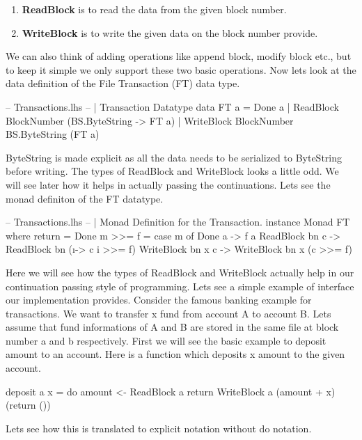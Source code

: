 \documentclass[11pt,a4paper]{article}
\begin{document}
\begin{enumerate}
\item \textbf{ReadBlock} is to read the data from the given block number.
\item \textbf{WriteBlock} is to write the given data on the block number provide.
\end{enumerate}

We can also think of adding operations like append block, modify block
etc., but to keep it simple we only support these two basic operations.
Now lets look at the data definition of the File Transaction (FT) data
type.

\begin{code}[name=Transactions]
-- Transactions.lhs
-- | Transaction Datatype
data FT a = 
    Done a | 
    ReadBlock BlockNumber (BS.ByteString -> FT a) | 
    WriteBlock BlockNumber BS.ByteString (FT a)
\end{code}

ByteString is made explicit as all the data needs to be serialized to ByteString before writing.
The types of ReadBlock and WriteBlock looks a little odd. We will see later how it helps in actually passing the continuations.
Lets see the monad definiton of the FT datatype.

\begin{code}[name=Transactions]
-- Transactions.lhs
-- | Monad Definition for the Transaction. 
instance Monad FT where 
    return = Done 
    m >>= f = case m of 
        Done a -> f a 
        ReadBlock bn c -> ReadBlock bn (\i -> c i  >>= f) 
        WriteBlock bn x c -> WriteBlock bn x (c >>= f)
\end{code}

Here we will see how the types of ReadBlock and WriteBlock actually help
in our continuation passing style of programming. Lets see a simple
example of interface our implementation provides.
Consider the famous banking example for transactions. We want to
transfer x fund from account A to account B.
Lets assume that fund informations of A and B are stored in the same
file at block number a and b respectively.
First we will see the basic example to deposit amount to an account. 
Here is a function which deposits x amount to the given account. 

\begin{code}
deposit a x = do 
      amount <- ReadBlock a return 
      WriteBlock a (amount + x) (return ())
\end{code}

Lets see how this is translated to explicit notation without do
notation.
\end{document}
